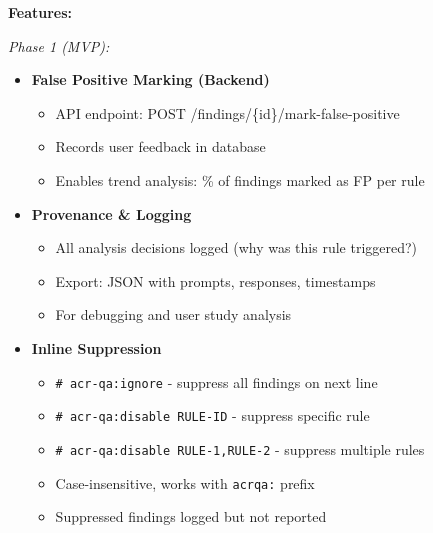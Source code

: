 \documentclass[11pt,a4paper]{article}
\begin{document}
\textbf{Features:}

\textit{Phase 1 (MVP):}
\begin{itemize}[leftmargin=*]
    \item \textbf{False Positive Marking (Backend)}
    \begin{itemize}
        \item API endpoint: POST /findings/\{id\}/mark-false-positive
        \item Records user feedback in database
        \item Enables trend analysis: \% of findings marked as FP per rule
    \end{itemize}

    \item \textbf{Provenance \& Logging}
    \begin{itemize}
        \item All analysis decisions logged (why was this rule triggered?)
        \item Export: JSON with prompts, responses, timestamps
        \item For debugging and user study analysis
    \end{itemize}

    \item \textbf{Inline Suppression}
    \begin{itemize}
        \item \texttt{\# acr-qa:ignore} - suppress all findings on next line
        \item \texttt{\# acr-qa:disable RULE-ID} - suppress specific rule
        \item \texttt{\# acr-qa:disable RULE-1,RULE-2} - suppress multiple rules
        \item Case-insensitive, works with \texttt{acrqa:} prefix
        \item Suppressed findings logged but not reported
    \end{itemize}
\end{itemize}
\end{document}
